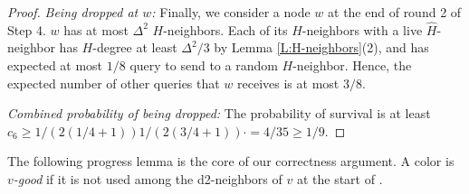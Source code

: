\begin{proof}

\textit{Being dropped at $w$:} Finally, we consider a node $w$ at the end of round 2 of Step 4. $w$ has at most $\Delta^2$ $H$-neighbors. Each of its $H$-neighbors with a live $\hat{H}$-neighbor has $H$-degree at least $\Delta^2/3$ by Lemma \ref{L:H-neighbors}(2), 
and has expected at most $1/8$ query to send to a random $H$-neighbor. 
Hence, the expected number of other queries that $w$ receives is at most $3/8$. 

\textit{Combined probability of being dropped:} The probability of survival is at least $c_6 \ge 1/(2(1/4+1)) 1/(2(3/4+1)) \cdot = 4/35 \ge 1/9$.
\end{proof}
\fi %

The following progress lemma is the core of our correctness argument.
A color is \emph{$v$-good} if it is not used among the d2-neighbors of $v$ at the start of .

